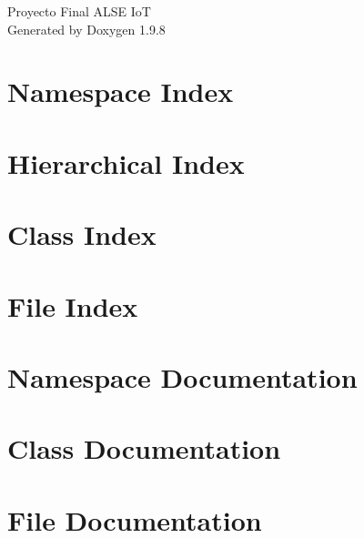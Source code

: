 \documentclass[twoside]{book}
\newcommand{\+}{\discretionary{\mbox{\scriptsize$\hookleftarrow$}}{}{}}
\newcommand{\clearemptydoublepage}{%
    \newpage{\pagestyle{empty}\cleardoublepage}%
  }
\begin{document}
  \raggedbottom
    \hypersetup{pageanchor=false,
                bookmarksnumbered=true,
                pdfencoding=unicode
               }
  \begin{titlepage}
  \vspace*{7cm}
  \begin{center}%
  {\Large Proyecto Final ALSE IoT}\\
  \vspace*{1cm}
  {\large Generated by Doxygen 1.9.8}\\
  \end{center}
  \end{titlepage}
  \clearemptydoublepage
  \tableofcontents
  \clearemptydoublepage
  \hypersetup{pageanchor=true}
\chapter{Namespace Index}

\chapter{Hierarchical Index}

\chapter{Class Index}

\chapter{File Index}

\chapter{Namespace Documentation}

\chapter{Class Documentation}






\chapter{File Documentation}



















  \backmatter
  \newpage
  \clearemptydoublepage
  \printindex
\end{document}
